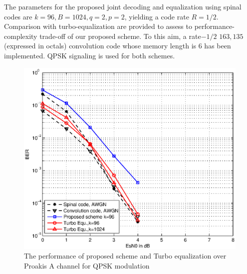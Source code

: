 \documentclass[conference]{IEEEtran}
\begin{document}
The parameters for the proposed joint decoding and equalization using spinal codes  are  $k=96, B=1024, q=2, p=2$, yielding a code rate $R=1/2$.
Comparison with turbo-equalization are provided to assess to performance-complexity trade-off of our proposed scheme. To this aim, a rate$-1/2$ $163,135$ (expressed in octals) convolution code whose memory length is 6 has been implemented. QPSK signaling is used for both schemes.
\begin{figure}[ht]
\centering
\includegraphics[width=\columnwidth]{ChAQPSKComparison.eps}
\caption{The performance of proposed scheme and Turbo equalization over Proakis A channel for QPSK modulation}
\label{fig_ChAQPSKComparison}
\end{figure}
\end{document}
